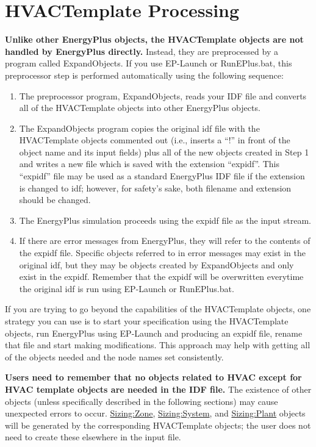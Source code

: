 \section{HVACTemplate Processing}\label{hvactemplate-processing}

\textbf{Unlike other EnergyPlus objects, the HVACTemplate objects are not handled by EnergyPlus directly.} Instead, they are preprocessed by a program called ExpandObjects. If you use EP-Launch or RunEPlus.bat, this preprocessor step is performed automatically using the following sequence:

\begin{enumerate}
\def\labelenumi{\arabic{enumi})}
\item
  The preprocessor program, ExpandObjects, reads your IDF file and converts all of the HVACTemplate objects into other EnergyPlus objects.
\item
  The ExpandObjects program copies the original idf file with the HVACTemplate objects commented out (i.e., inserts a ``!'' in front of the object name and its input fields) plus all of the new objects created in Step 1 and writes a new file which is saved with the extension ``expidf''. This ``expidf'' file may be used as a standard EnergyPlus IDF file if the extension is changed to idf; however, for safety's sake, both filename and extension should be changed.
\item
  The EnergyPlus simulation proceeds using the expidf file as the input stream.
\item
  If there are error messages from EnergyPlus, they will refer to the contents of the expidf file. Specific objects referred to in error messages may exist in the original idf, but they may be objects created by ExpandObjects and only exist in the expidf. Remember that the expidf will be overwritten everytime the original idf is run using EP-Launch or RunEPlus.bat.
\end{enumerate}

If you are trying to go beyond the capabilities of the HVACTemplate objects, one strategy you can use is to start your specification using the HVACTemplate objects, run EnergyPlus using EP-Launch and producing an expidf file, rename that file and start making modifications. This approach may help with getting all of the objects needed and the node names set consistently.

\textbf{Users need to remember that no objects related to HVAC except for HVAC template objects are needed in the IDF file.} The existence of other objects (unless specifically described in the following sections) may cause unexpected errors to occur. \hyperref[sizingzone]{Sizing:Zone}, \hyperref[sizingsystem]{Sizing:System}, and \hyperref[sizingplant]{Sizing:Plant} objects will be generated by the corresponding HVACTemplate objects; the user does not need to create these elsewhere in the input file.

